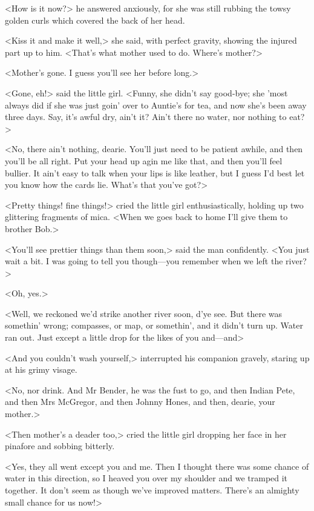 <How is it now?> he answered anxiously, for she was still rubbing the towsy golden curls which covered the back of her head.

<Kiss it and make it well,> she said, with perfect gravity, showing the injured part up to him. <That's what mother used to do. Where's mother?>

<Mother's gone. I guess you'll see her before long.>

<Gone, eh!> said the little girl. <Funny, she didn't say good-bye; she 'most always did if she was just goin' over to Auntie's for tea, and now she's been away three days. Say, it's awful dry, ain't it? Ain't there no water, nor nothing to eat?>

<No, there ain't nothing, dearie. You'll just need to be patient awhile, and then you'll be all right. Put your head up agin me like that, and then you'll feel bullier. It ain't easy to talk when your lips is like leather, but I guess I'd best let you know how the cards lie. What's that you've got?>

<Pretty things! fine things!> cried the little girl enthusiastically, holding up two glittering fragments of mica. <When we goes back to home I'll give them to brother Bob.>

<You'll see prettier things than them soon,> said the man confidently. <You just wait a bit. I was going to tell you though—you remember when we left the river?>

<Oh, yes.>

<Well, we reckoned we'd strike another river soon, d'ye see. But there was somethin' wrong; compasses, or map, or somethin', and it didn't turn up. Water ran out. Just except a little drop for the likes of you and—and\longdash>

<And you couldn't wash yourself,> interrupted his companion gravely, staring up at his grimy visage.

<No, nor drink. And Mr Bender, he was the fust to go, and then Indian Pete, and then Mrs McGregor, and then Johnny Hones, and then, dearie, your mother.>

<Then mother's a deader too,> cried the little girl dropping her face in her pinafore and sobbing bitterly.

<Yes, they all went except you and me. Then I thought there was some chance of water in this direction, so I heaved you over my shoulder and we tramped it together. It don't seem as though we've improved matters. There's an almighty small chance for us now!>

